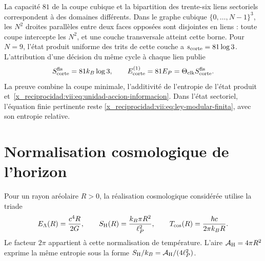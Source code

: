 La capacité \(81\) de la coupe cubique et la bipartition des trente-six
liens sectoriels correspondent à des domaines différents. Dans le
graphe cubique \(\{0,\ldots,N-1\}^3\), les \(N^2\) droites
parallèles entre deux faces opposées sont disjointes en liens : toute coupe
intercepte les \(N^2\), et une couche transversale atteint cette borne.
Pour \(N=9\), l'état produit uniforme des trits de cette couche
a \(s_{\rm corte}=81\log3\). L'attribution d'une décision du
même cycle à chaque lien publie
\begin{equation}
 S_{\rm corte}^{\rm fis}=81k_B\log3,\qquad
 E_{\rm corte}^{(1)}=81E_P
                  =\Theta_{\rm clk}S_{\rm corte}^{\rm fis}.
 \label{x_reciprocidad:vii:eq:corte-energia-informacion}
\end{equation}
La preuve combine la coupe minimale, l'additivité de l'entropie de l'état produit et~\eqref{x_reciprocidad:vii:eq:unidad-accion-informacion}. Dans l'état sectoriel, l'équation finie pertinente reste \eqref{x_reciprocidad:vii:eq:ley-modular-finita}, avec son entropie relative.

\section{Normalisation cosmologique de l'horizon}
\label{x_reciprocidad:vii:subsec:balance-horizonte}

Pour un rayon aréolaire \(R>0\), la réalisation cosmologique considérée utilise la triade
\begin{equation}
 E_\Lambda(R)=\frac{c^4R}{2G},\qquad
 S_{\rm H}(R)=\frac{k_B\pi R^2}{\ell_P^2},\qquad
 T_{\rm cos}(R)=\frac{\hbar c}{2\pi k_BR}.
 \label{x_reciprocidad:vii:eq:horizonte-cosmologico}
\end{equation}
Le facteur \(2\pi\) appartient à cette normalisation de température.
L'aire \(\mathcal A_{\rm H}=4\pi R^2\) exprime la même entropie
sous la forme \(S_{\rm H}/k_B=\mathcal A_{\rm H}/(4\ell_P^2)\).

